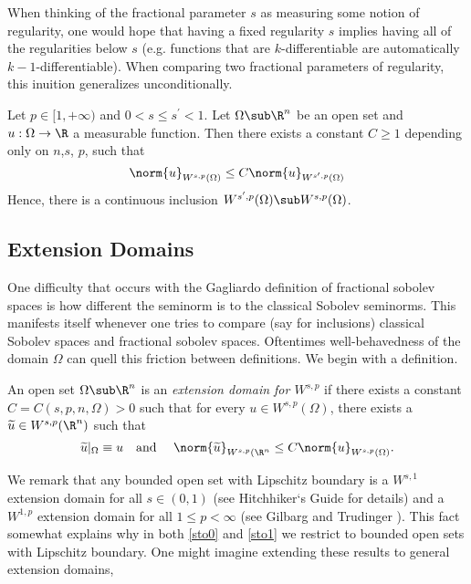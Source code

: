 \documentclass[../main.tex]{subfiles}
\begin{document}
When thinking of the fractional parameter $ s $ as measuring some notion of regularity, one would hope that having a fixed regularity $ s $ implies having all of the regularities below $ s $ (e.g. functions that are $ k $-differentiable are automatically $ k-1 $-differentiable). When comparing two fractional parameters of regularity, this inuition generalizes unconditionally.

\begin{proposition}\label{fracisscale}
    Let $ p\in[1,+\infty) $ and $ 0 < s \leq s^{\prime} < 1 $. Let $ \Omega\sub \R^{n} $ be an open set and $ u:\Omega\to \R $ a measurable function. Then there exists a constant $ C \geq 1 $ depending only on $ n$,$s$, $p$, such that
    \[
        \norm{u}_{W^{s,p}(\Omega)} \leq C\norm{u}_{W^{s^{\prime},p}(\Omega)}
    \]
    Hence, there is a continuous inclusion $ W^{s^{\prime},p}(\Omega)\sub W^{s,p}(\Omega)$.
\end{proposition}


\subsection{Extension Domains}

One difficulty that occurs with the Gagliardo definition of fractional sobolev spaces is how different the seminorm is to the classical Sobolev seminorms.
This manifests itself whenever one tries to compare (say for inclusions) classical Sobolev spaces and fractional sobolev spaces. Oftentimes well-behavedness of the domain $ \Omega $ can quell this friction between definitions. We begin with a definition.

\begin{definition}\label{extndomain}
    An open set $ \Omega\sub \R^{n} $ is an \textit{extension domain for $ W^{s,p} $} if  there exists a constant $ C = C(s,p,n,\Omega) > 0 $ such that for every $ u\in W^{s,p}(\Omega) $, there exists a $ \widetilde{u}\in W^{s,p}(\R^{n}) $ such that 
    \[
        \widetilde{u}\vert_{\Omega} \equiv u \quad\text{and }\quad \norm{\widetilde{u}}_{W^{s,p}(\R^{n}}\leq C \norm{u}_{W^{s,p}(\Omega)}.
    \]
\end{definition}

We remark that any bounded open set with Lipschitz boundary is a $ W^{s,1} $ extension domain for all $ s\in (0,1) $ (see Hitchhiker`s Guide \cite{hitchhiker} for details) and a $ W^{1,p} $ extension domain for all $ 1\leq p <\infty $ (see Gilbarg and Trudinger \cite[Thm.~7.25]{gilbarg}). This fact somewhat explains why in both \ref{sto0} and \ref{sto1} we restrict to bounded open sets with Lipschitz boundary. One might imagine extending these results to general extension domains, 
\end{document}

